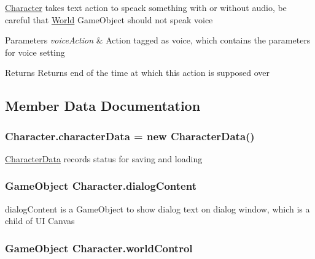 \hyperlink{class_character}{Character} takes text action to speack something with or without audio, be careful that \hyperlink{class_world}{World} Game\+Object should not speak voice 


\begin{DoxyParams}{Parameters}
{\em voice\+Action} & Action tagged as voice, which contains the parameters for voice setting\\
\hline
\end{DoxyParams}
\begin{DoxyReturn}{Returns}
Returns end of the time at which this action is supposed over
\end{DoxyReturn}


\subsection{Member Data Documentation}
\subsubsection[{\texorpdfstring{character\+Data}{characterData}}]{ Character.\+character\+Data = new {\bf Character\+Data}()}\hypertarget{class_character_af86674f9440ec86b61c057dbc1b8586e}{}\label{class_character_af86674f9440ec86b61c057dbc1b8586e}


\hyperlink{class_character_data}{Character\+Data} records status for saving and loading 

\subsubsection[{\texorpdfstring{dialog\+Content}{dialogContent}}]{\setlength{\rightskip}{0pt plus 5cm}Game\+Object Character.\+dialog\+Content}\hypertarget{class_character_a9eb4f04ae4acf1fa7666b93d1f5c5da6}{}\label{class_character_a9eb4f04ae4acf1fa7666b93d1f5c5da6}


dialog\+Content is a Game\+Object to show dialog text on dialog window, which is a child of UI Canvas 

\subsubsection[{\texorpdfstring{world\+Control}{worldControl}}]{\setlength{\rightskip}{0pt plus 5cm}Game\+Object Character.\+world\+Control}\hypertarget{class_character_acb8eae0fe1b057a002e83b9fe6c5e02c}{}\label{class_character_acb8eae0fe1b057a002e83b9fe6c5e02c}


